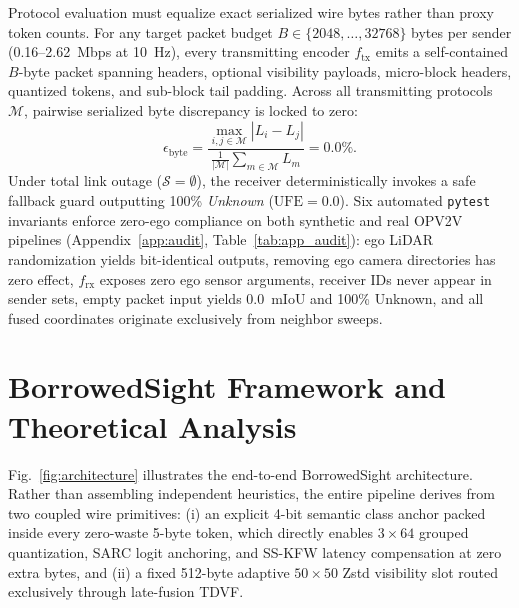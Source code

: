 \documentclass[journal]{IEEEtran}
\begin{document}
Protocol evaluation must equalize exact serialized wire bytes rather than proxy token counts. For any target packet budget $B \in \{2048, \dots, 32768\}$ bytes per sender (0.16--2.62~Mbps at 10~Hz), every transmitting encoder $f_{\mathrm{tx}}$ emits a self-contained $B$-byte packet spanning headers, optional visibility payloads, micro-block headers, quantized tokens, and sub-block tail padding. Across all transmitting protocols $\mathcal{M}$, pairwise serialized byte discrepancy is locked to zero:
\begin{equation}
\epsilon_{\mathrm{byte}} = \frac{\max_{i,j \in \mathcal{M}} |L_i - L_j|}{\frac{1}{|\mathcal{M}|}\sum_{m \in \mathcal{M}} L_m} = 0.0\%.
\label{eq:byte_fairness}
\end{equation}
Under total link outage ($\mathcal{S} = \emptyset$), the receiver deterministically invokes a safe fallback guard outputting 100\% \textit{Unknown} ($\mathrm{UFE} = 0.0$). Six automated \texttt{pytest} invariants enforce zero-ego compliance on both synthetic and real OPV2V pipelines (Appendix~\ref{app:audit}, Table~\ref{tab:app_audit}): ego LiDAR randomization yields bit-identical outputs, removing ego camera directories has zero effect, $f_{\mathrm{rx}}$ exposes zero ego sensor arguments, receiver IDs never appear in sender sets, empty packet input yields 0.0~mIoU and 100\% Unknown, and all fused coordinates originate exclusively from neighbor sweeps.

\section{BorrowedSight Framework and Theoretical Analysis}
\label{sec:method}

Fig.~\ref{fig:architecture} illustrates the end-to-end BorrowedSight architecture. Rather than assembling independent heuristics, the entire pipeline derives from two coupled wire primitives: (i) an explicit 4-bit semantic class anchor packed inside every zero-waste 5-byte token, which directly enables $3\times 64$ grouped quantization, SARC logit anchoring, and SS-KFW latency compensation at zero extra bytes, and (ii) a fixed 512-byte adaptive $50\times 50$ Zstd visibility slot routed exclusively through late-fusion TDVF.
\end{document}

